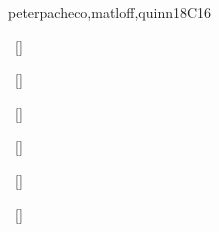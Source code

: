 \begin{syllabus}
\begin{unit}{\PDParallelDecomposition}{}{peterpacheco,matloff,quinn}{18}{C16}
\begin{topics}%
    \item \PDParallelDecompositionTopicNeed
    \item \PDParallelDecompositionTopicIndependence
    \item \PDParallelDecompositionTopicBasic
    \item \PDParallelDecompositionTopicTask
    \item \PDParallelDecompositionTopicData
    \item \PDParallelDecompositionTopicActors
\end{topics}
\begin{learningoutcomes}%
    \item \PDParallelDecompositionLOExplainWhyNecessary~[\Usage] %
    \item \PDParallelDecompositionLOIdentifyOpportunities~[\Familiarity] %
    \item \PDParallelDecompositionLOWriteAScalable~[\Usage] %
    \item \PDParallelDecompositionLOParallelize~[\Usage] %
    \item \PDParallelDecompositionLOParallelizeAn~[\Usage] %
    \item \PDParallelDecompositionLOWriteAActors~[\Usage] %
\end{learningoutcomes}%
\end{unit}


\end{syllabus}
